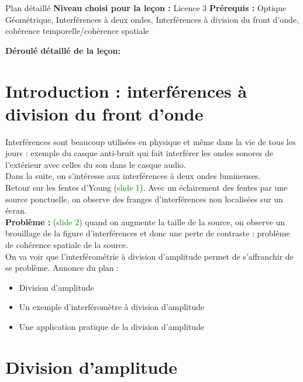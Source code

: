 \begin{reportBlock}{Plan détaillé}
  \textbf{Niveau choisi pour la leçon :} Licence 3
  \newline
  \textbf{Prérequis :} Optique Géométrique, Interférences à deux ondes, Interférences à division du front d'onde, cohérence temporelle/cohérence spatiale
  \newline
  
  \textbf{Déroulé détaillé de la leçon: }\newline
  \section*{Introduction : interférences à division du front d'onde}
  Interférences sont beaucoup utilisées en physique et même dans la vie de tous les jours : exemple du casque anti-bruit qui fait interférer les ondes sonores de l'extérieur avec celles du son dans le casque audio.\\
  Dans la suite, on s'intéresse aux interférences à deux ondes lumineuses.\\
  Retour sur les fentes d'Young (\textcolor{green}{slide 1}). Avec un éclairement des fentes par une source ponctuelle, on observe des franges d'interférences non localisées sur un écran.\\
  \textbf{Problème :} (\textcolor{green}{slide 2}) quand on augmente la taille de la source, on observe un brouillage de la figure d'interférences et donc une perte de contraste : problème de cohérence spatiale de la source.\\
  On va voir que l'interférométrie à division d'amplitude permet de s'affranchir de se problème.
  Annonce du plan : 
  \begin{itemize}
      \item Division d'amplitude
      \item Un exemple d'interféromètre à division d'amplitude
      \item Une application pratique de la division d'amplitude
  \end{itemize}
  
  \section{Division d'amplitude}

\end{reportBlock}

